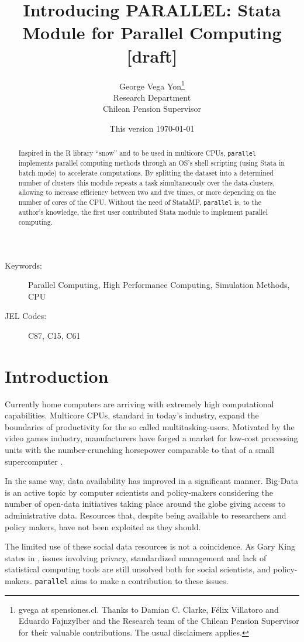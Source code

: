 \documentclass[letterpaper, 10pt]{article}
\author{George Vega Yon\thanks{gvega at spensiones.cl. Thanks to Damian C. Clarke, F\'elix Villatoro and Eduardo Fajnzylber and the Research team of the Chilean Pension Supervisor for their valuable contributions. The usual disclaimers applies.}\\Research Department\\Chilean Pension Supervisor}
\title{Introducing PARALLEL: Stata Module for Parallel Computing [draft]}
\date{This version \today}
\begin{document}
\maketitle

\begin{abstract}
Inspired in the R library ``snow'' and to be used in multicore CPUs, {\tt parallel}
implements parallel computing methods through an OS's shell scripting (using
Stata in batch mode) to accelerate computations. By splitting the dataset into
a determined number of clusters this module repeats a task simultaneously over
the data-clusters, allowing to increase efficiency between two and five times,
or more depending on the number of cores of the CPU. Without the need of StataMP,
{\tt parallel} is, to the author's knowledge, the first user contributed Stata
module to implement parallel computing.
\end{abstract}

{\footnotesize 
\begin{description}
\item[Keywords:] Parallel Computing, High Performance Computing, Simulation Methods, CPU
\item[JEL Codes:] C87, C15, C61
\end{description}
}

\clearpage

\section{Introduction}

Currently home computers are arriving with extremely high computational capabilities. Multicore CPUs, standard in today's industry, expand the boundaries of productivity for the so called multitasking-users. Motivated by the video games industry, manufacturers have forged a market for low-cost processing units with the number-crunching horsepower comparable to that of a small supercomputer \cite{aldrich2011}.

In the same way, data availability has improved in a significant manner. Big-Data is an active topic by computer scientists and policy-makers considering the number of open-data initiatives taking place around the globe giving access to administrative data. Resources that, despite being available to researchers and policy makers, have not been exploited as they should.

The limited use of these social data resources is not a coincidence. As Gary King states in , issues involving privacy, standardized management and lack of statistical computing tools are still unsolved both for social scientists, and policy-makers. {\tt parallel} aims to make a contribution to these issues.
\end{document}
